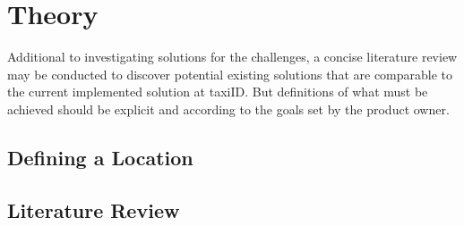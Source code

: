 
\chapter{Theory}

\ifpdf
    \graphicspath{{Chapter2/Figs/Raster/}{Chapter2/Figs/PDF/}{Chapter2/Figs/}}
\else
    \graphicspath{{Chapter2/Figs/Vector/}{Chapter2/Figs/}}
\fi

Additional to investigating solutions for the challenges, a concise literature review may be conducted to discover potential existing solutions that are comparable to the current implemented solution at taxiID. But definitions of what must be achieved should be explicit and according to the goals set by the product owner.

\section{Defining a Location}

\section{Literature Review}
